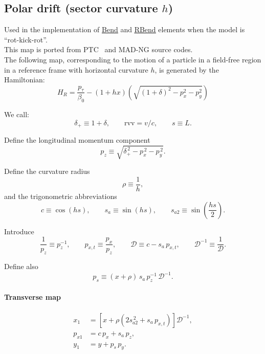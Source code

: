 \subsection{Polar drift (sector curvature $h$)}

Used in the implementation of \href{https://xsuite.readthedocs.io/en/latest/apireference.html#bend}{\underline{Bend}}
and \href{https://xsuite.readthedocs.io/en/latest/apireference.html#rbend}{\underline{RBend}} elements
when the model is ``rot-kick-rot''.
~\\
This map is ported from PTC~\cite{ptc_report} and MAD-NG source codes.
~\\

The following map, corresponding to the motion of a particle in a field-free region
in a reference frame with horizontal curvature $h$,  is generated by the Hamiltonian:
\begin{equation}
H_R = \frac{p_\tau}{\beta_0} -(1 + hx) \left( \sqrt{(1 + \delta)^2 - p_x^2 - p_y^2}\right)
\end{equation}

We call:
\[
\delta_+ \equiv 1+\delta,\qquad \mathrm{rvv}=v/c,
\qquad s \equiv L.
\]

Define the longitudinal momentum component
\begin{equation}
p_z \equiv \sqrt{\delta_+^{\,2}-p_x^{\,2}-p_y^{\,2}} .
\end{equation}

Define the curvature radius
\begin{equation}
\rho \equiv \frac{1}{h},
\end{equation}
and the trigonometric abbreviations
\begin{equation}
c \equiv \cos(hs),\qquad
s_a \equiv \sin(hs),\qquad
s_{a2}\equiv \sin\!\left(\frac{hs}{2}\right).
\end{equation}

Introduce
\begin{equation}
\frac{1}{p_z} \equiv p_z^{-1},\qquad
p_{x,t} \equiv \frac{p_x}{p_z},
\qquad
\mathcal{D} \equiv c - s_a\, p_{x,t},
\qquad
\mathcal{D}^{-1} \equiv \frac{1}{\mathcal{D}}.
\end{equation}

Define also
\begin{equation}
p_s \equiv (x+\rho)\, s_a\, p_z^{-1}\, \mathcal{D}^{-1}.
\end{equation}

\paragraph{Transverse map}
\begin{align}
x_1 &=
\left[
x+\rho\left(2 s_{a2}^{\,2}+ s_a\, p_{x,t}\right)
\right]\mathcal{D}^{-1},
\\
p_{x1} &= c\,p_x + s_a\, p_z,
\\
y_1 &= y + p_s\, p_y.
\end{align}

